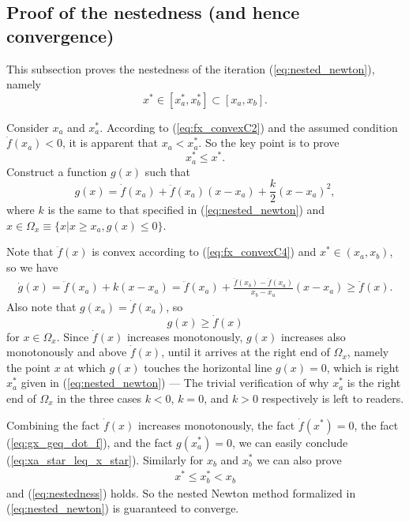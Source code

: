 \documentclass[12pt]{article}
\begin{document}
\subsection{Proof of the nestedness (and hence convergence)}  \label{sec:proof_nestedness}

This subsection proves the nestedness of the iteration (\ref{eq:nested_newton}), namely
\begin{equation}  \label{eq:nestedness}
x^* \in [x_a^*, x_b^*] \subset [x_a, x_b]. 
\end{equation}

Consider $x_a$ and $x_a^*$. According to (\ref{eq:fx_convexC2}) and the assumed condition $\dot{f}(x_a) < 0$, it is apparent that $x_a < x_a^*$. So the key point is to prove
\begin{equation}  \label{eq:xa_star_leq_x_star}
x_a^* \leq x^*.
\end{equation}
Construct a function $g(x)$ such that
\begin{equation}  \label{eq:gx_def}
g(x) = \dot{f}(x_a) + \ddot{f}(x_a)(x - x_a) + \frac{k}{2} (x - x_a)^2,
\end{equation}
where $k$ is the same to that specified in (\ref{eq:nested_newton}) and $x \in \Omega_x \equiv \{x | x \geq x_a , g(x) \leq 0\}$.

Note that $\ddot{f}(x)$ is convex according to (\ref{eq:fx_convexC4}) and $x^* \in (x_a, x_b)$, so we have
\begin{align*}
\dot{g}(x) = \ddot{f}(x_a) + k (x - x_a) = \ddot{f}(x_a) + \frac{\ddot{f}(x_b) - \ddot{f}(x_a)}{x_b - x_a} (x - x_a) \geq \ddot{f}(x).
\end{align*}
Also note that $g(x_a) = \dot{f}(x_a)$, so
\begin{equation}  \label{eq:gx_geq_dot_f}
g(x) \geq \dot{f}(x)
\end{equation}
for $x \in \Omega_x$. Since $\dot{f}(x)$ increases monotonously, $g(x)$ increases also monotonously and above $\dot{f}(x)$, until it arrives at the right end of $\Omega_x$, namely the point $x$ at which $g(x)$ touches the horizontal line $g(x) = 0$, which is right $x_a^*$ given in (\ref{eq:nested_newton}) --- The trivial verification of why $x_a^*$ is the right end of $\Omega_x$ in the three cases $k<0$, $k=0$, and $k>0$ respectively is left to readers. 

Combining the fact $\dot{f}(x)$ increases monotonously, the fact $\dot{f}(x^*) = 0$, the fact (\ref{eq:gx_geq_dot_f}), and the fact $g(x_a^*) = 0$, we can easily conclude (\ref{eq:xa_star_leq_x_star}). Similarly for $x_b$ and $x_b^*$ we can also prove
\begin{align*}
x^* \leq x_b^* < x_b
\end{align*}
and (\ref{eq:nestedness}) holds. So the nested Newton method formalized in (\ref{eq:nested_newton}) is guaranteed to converge.
\end{document}
